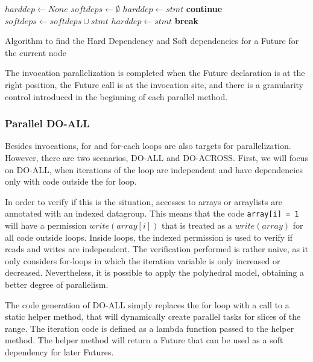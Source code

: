\documentclass[smallextended]{svjour3}
\begin{document}
\begin{algorithm}
\begin{algorithmic}
\State $harddep \gets None$
\State $softdeps \gets \emptyset$
        \State $harddep \gets stmt $
        \State \textbf{continue}
    \EndIf
            \State $softdeps \gets softdeps \cup stmt$
        \Else
            \State $harddep \gets stmt$
        \EndIf
    \EndIf
        \State \textbf{break}
    \EndIf
\EndFor
\label{algo:position}
\caption{Algorithm to find the Hard Dependency and Soft dependencies for a Future for the current node}
\end{algorithmic}
\end{algorithm}

The invocation parallelization is completed when the Future declaration is at the right position, the Future call is at the invocation site, and there is a granularity control introduced in the beginning of each parallel method.

\subsubsection{Parallel DO-ALL}

Besides invocations, for and for-each loops are also targets for parallelization. However, there are two scenarios, DO-ALL and DO-ACROSS. First, we will focus on DO-ALL, when iterations of the loop are independent and have dependencies only with code outside the for loop.

In order to verify if this is the situation, accesses to arrays or arraylists are annotated with an indexed datagroup. This means that the code \lstinline|array[i] = 1| will have a permission $write(array[i])$ that is treated as a $write(array)$ for all code outside loops. Inside loops, the indexed permission is used to verify if reads and writes are independent. The verification performed is rather naïve, as it only considers for-loops in which the iteration variable is only increased or decreased. Nevertheless, it is possible to apply the polyhedral model, obtaining a better degree of parallelism.

The code generation of DO-ALL simply replaces the for loop with a call to a static helper method, that will dynamically create parallel tasks for slices of the range. The iteration code is defined as a lambda function passed to the helper method. The helper method will return a Future that can be used as a soft dependency for later Futures.
\end{document}
